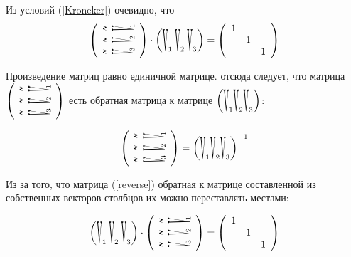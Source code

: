 \documentclass[a4paper,12pt]{article}
\begin{document}
Из условий (\ref{Kroneker}) очевидно, что 
\begin{equation}
\left(
\begin{array}{l}
        \rotatebox{90}{\raisebox{-0.25cm}{\scalebox{0.75}[3.1]{$\widetilde{V}$}$_{\!\!1}$}} \\
        \rotatebox{90}{\raisebox{-0.25cm}{\scalebox{0.75}[3.1]{$\widetilde{V}$}$_{\!\!2}$}} \\
        \rotatebox{90}{\raisebox{-0.25cm}{\scalebox{0.75}[3.1]{$\widetilde{V}$}$_{\!\!3}$}}
\end{array}
\right)
\cdot
\left(\vectorcol{V}{1}\:\vectorcol{V}{2}\:\vectorcol{V}{3}\right) =
\left(
\begin{array}{ccc}
        1 \\
        & 1 \\
        && 1
\end{array}
\right)
	\label{equalone}
\end{equation}

Произведение матриц равно единичной матрице. отсюда следует, что матрица $
\left(
\begin{array}{l}
        \rotatebox{90}{\raisebox{-0.25cm}{\scalebox{0.75}[3.1]{$\widetilde{V}$}$_{\!\!1}$}} \\
        \rotatebox{90}{\raisebox{-0.25cm}{\scalebox{0.75}[3.1]{$\widetilde{V}$}$_{\!\!2}$}} \\
        \rotatebox{90}{\raisebox{-0.25cm}{\scalebox{0.75}[3.1]{$\widetilde{V}$}$_{\!\!3}$}}
\end{array}
\right)
$ есть обратная матрица к матрице $\left(\vectorcol{V}{1} \vectorcol{V}{2} \vectorcol{V}{3}\right)$:

$$
\left(
\begin{array}{l}
        \rotatebox{90}{\raisebox{-0.25cm}{\scalebox{0.75}[3.1]{$\widetilde{V}$}$_{\!\!1}$}} \\
        \rotatebox{90}{\raisebox{-0.25cm}{\scalebox{0.75}[3.1]{$\widetilde{V}$}$_{\!\!2}$}} \\
        \rotatebox{90}{\raisebox{-0.25cm}{\scalebox{0.75}[3.1]{$\widetilde{V}$}$_{\!\!3}$}}
\end{array}
\right) =
\left(\vectorcol{V}{1} \vectorcol{V}{2} \vectorcol{V}{3}\right)^{-1}
$$

Из за того, что матрица (\ref{reverse}) обратная к матрице составленной из собственных векторов-столбцов
их можно переставлять местами:

$$
\left(\vectorcol{V}{1}\:\vectorcol{V}{2}\:\vectorcol{V}{3}\right)\cdot
\left(
\begin{array}{l}
        \rotatebox{90}{\raisebox{-0.25cm}{\scalebox{0.75}[3.1]{$\widetilde{V}$}$_{\!\!1}$}} \\
        \rotatebox{90}{\raisebox{-0.25cm}{\scalebox{0.75}[3.1]{$\widetilde{V}$}$_{\!\!2}$}} \\
        \rotatebox{90}{\raisebox{-0.25cm}{\scalebox{0.75}[3.1]{$\widetilde{V}$}$_{\!\!3}$}}
\end{array}
\right) =
\left(
\begin{array}{ccc}
        1 \\
        & 1 \\
        && 1
\end{array}
\right)
$$
\end{document}
